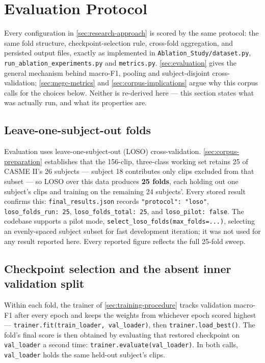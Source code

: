 \section{Evaluation Protocol}
\label{sec:evaluation-protocol}

Every configuration in \autoref{sec:research-approach} is scored by the same protocol: the same fold structure, checkpoint-selection rule, cross-fold aggregation, and persisted output files, exactly as implemented in \texttt{Ablation\_Study/dataset.py}, \texttt{run\_ablation\_experiments.py} and \texttt{metrics.py}. \autoref{sec:evaluation} gives the general mechanism behind macro-F1, pooling and subject-disjoint cross-validation; \autoref{sec:megc-metrics} and \autoref{sec:corpus-implications} argue why this corpus calls for the choices below. Neither is re-derived here --- this section states what was actually run, and what its properties are.

\subsection{Leave-one-subject-out folds}
\label{sec:loso-folds}

Evaluation uses leave-one-subject-out (LOSO) cross-validation. \autoref{sec:corpus-preparation} establishes that the 156-clip, three-class working set retains 25 of CASME II's 26 subjects --- subject 18 contributes only clips excluded from that subset --- so LOSO over this data produces \textbf{25 folds}, each holding out one subject's clips and training on the remaining 24 subjects'. Every stored result confirms this: \texttt{final\_results.json} records \texttt{"protocol": "loso"}, \texttt{loso\_folds\_run: 25}, \texttt{loso\_folds\_total: 25}, and \texttt{loso\_pilot: false}. The codebase supports a pilot mode, \verb|select_loso_folds(max_folds=...)|, selecting an evenly-spaced subject subset for fast development iteration; it was not used for any result reported here. Every reported figure reflects the full 25-fold sweep.

\subsection{Checkpoint selection and the absent inner validation split}
\label{sec:checkpoint-selection}

Within each fold, the trainer of \autoref{sec:training-procedure} tracks validation macro-F1 after every epoch and keeps the weights from whichever epoch scored highest --- \verb|trainer.fit(train_loader, val_loader)|, then \verb|trainer.load_best()|. The fold's final score is then obtained by evaluating that restored checkpoint on \texttt{val\_loader} a second time: \verb|trainer.evaluate(val_loader)|. In both calls, \texttt{val\_loader} holds the same held-out subject's clips.

